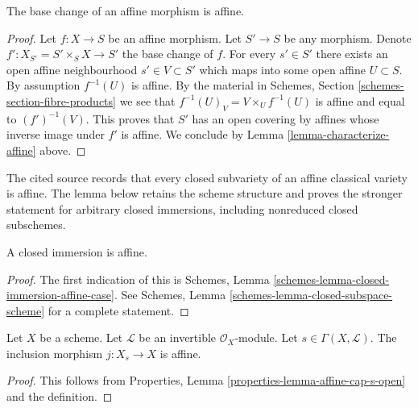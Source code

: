 \begin{lemma}
\label{lemma-base-change-affine}
The base change of an affine morphism is affine.
\end{lemma}

\begin{proof}
Let $f : X \to S$ be an affine morphism. Let $S' \to S$ be any morphism.
Denote $f' : X_{S'} = S' \times_S X \to S'$ the base change of $f$.
For every $s' \in S'$ there exists an open affine neighbourhood
$s' \in V \subset S'$ which maps into some open affine $U \subset S$.
By assumption $f^{-1}(U)$ is affine. By the material in
Schemes, Section \ref{schemes-section-fibre-products} we see
that $f^{-1}(U)_V = V \times_U f^{-1}(U)$ is affine and equal
to $(f')^{-1}(V)$. This proves that $S'$ has an open covering by
affines whose inverse image under $f'$ is affine. We conclude
by Lemma \ref{lemma-characterize-affine} above.
\end{proof}

\begin{lemma}
\label{lemma-closed-immersion-affine}
\begin{reference}
\cite[Chapter II, \S 3, no. 42, pp. 233--234]{FAC}
\end{reference}
\begin{history}
The cited source records that every closed subvariety of an affine classical
variety is affine. The lemma below retains the scheme structure and proves
the stronger statement for arbitrary closed immersions, including nonreduced
closed subschemes.
\end{history}
A closed immersion is affine.
\end{lemma}

\begin{proof}
The first indication of this is
Schemes, Lemma \ref{schemes-lemma-closed-immersion-affine-case}.
See Schemes, Lemma \ref{schemes-lemma-closed-subspace-scheme}
for a complete statement.
\end{proof}

\begin{lemma}
\label{lemma-affine-s-open}
Let $X$ be a scheme.
Let $\mathcal{L}$ be an invertible $\mathcal{O}_X$-module.
Let $s \in \Gamma(X, \mathcal{L})$.
The inclusion morphism $j : X_s \to X$ is affine.
\end{lemma}

\begin{proof}
This follows from Properties, Lemma \ref{properties-lemma-affine-cap-s-open}
and the definition.
\end{proof}

